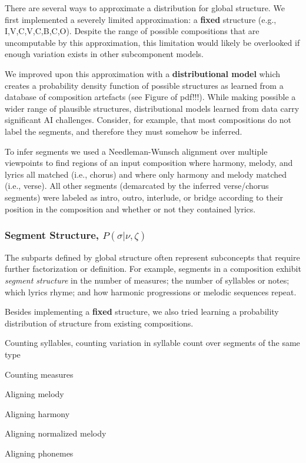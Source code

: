 \documentclass[letterpaper]{article}
\begin{document}
There are several ways to approximate a distribution for global structure. We first implemented a severely limited approximation: a \textbf{fixed} structure (e.g., I,V,C,V,C,B,C,O). Despite the range of possible compositions that are uncomputable by this approximation, this limitation would likely be overlooked if enough variation exists in other subcomponent models.

We improved upon this approximation with a \textbf{distributional model} which creates a probability density function of possible structures as learned from a database of composition artefacts (see Figure of pdf!!!). While making possible a wider range of plausible structures, distributional models learned from data carry significant AI challenges. Consider, for example, that most compositions do not label the segments, and therefore they must somehow be inferred.

To infer segments we used a Needleman-Wunsch alignment over multiple viewpoints to find regions of an input composition where harmony, melody, and lyrics all matched (i.e., chorus) and where only harmony and melody matched (i.e., verse). All other segments (demarcated by the inferred verse/chorus segments) were labeled as intro, outro, interlude, or bridge according to their position in the composition and whether or not they contained lyrics.

\subsubsection{Segment Structure, $P(\sigma|\nu,\zeta)$}

The subparts defined by global structure often represent subconcepts that require further factorization or definition. For example, segments in a composition exhibit \textit{segment structure} in the number of measures; the number of syllables or notes; which lyrics rhyme; and how harmonic progressions or melodic sequences repeat. 

Besides implementing a \textbf{fixed} structure, we also tried learning a probability distribution of structure from existing compositions. 

Counting syllables, counting variation in syllable count over segments of the same type

Counting measures

Aligning melody

Aligning harmony

Aligning normalized melody

Aligning phonemes
\end{document}
